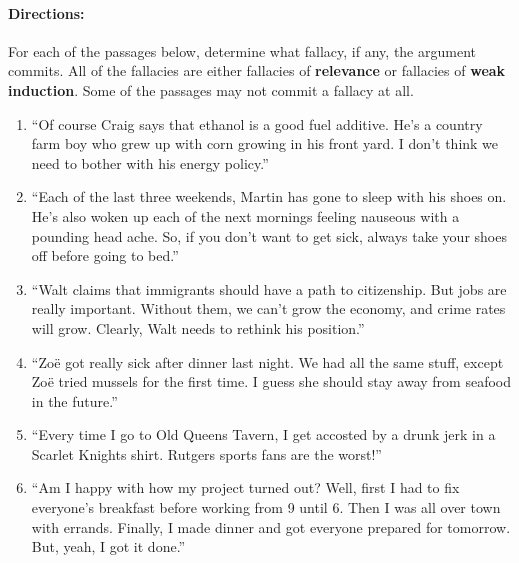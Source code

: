 \documentclass[letterpaper,12pt]{article}
\begin{document}
\paragraph{Directions:} For each of the passages below, determine what fallacy, if any, the argument commits.  All of the fallacies are either fallacies of \textbf{relevance} or fallacies of \textbf{weak induction}.  Some of the passages may not commit a fallacy at all.

\begin{enumerate}
  \setlength\itemsep{20pt}
  
  \item ``Of course Craig says that ethanol is a good fuel additive.  He's a country farm boy who grew up with corn growing in his front yard.  I don't think we need to bother with his energy policy.''
  
  \item ``Each of the last three weekends, Martin has gone to sleep with his shoes on.  He's also woken up each of the next mornings feeling nauseous with a pounding head ache.  So, if you don't want to get sick, always take your shoes off before going to bed.''
  
  \item ``Walt claims that immigrants should have a path to citizenship.  But jobs are really important.  Without them, we can't grow the economy, and crime rates will grow.  Clearly, Walt needs to rethink his position.''
  
  \item ``Zo\"{e} got really sick after dinner last night.  We had all the same stuff, except Zo\"{e} tried mussels for the first time.  I guess she should stay away from seafood in the future.''
  
  \item ``Every time I go to Old Queens Tavern, I get accosted by a drunk jerk in a Scarlet Knights shirt.  Rutgers sports fans are the worst!''
  
  \item ``Am I happy with how my project turned out? Well, first I had to fix everyone's breakfast before working from 9 until 6.  Then I was all over town with errands. Finally, I made dinner and got everyone prepared for tomorrow. But, yeah, I got it done.''
  
\end{enumerate}
\end{document}
